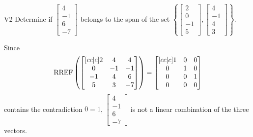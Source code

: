\documentclass{sbgLAexam}
\begin{document}
\begin{problem}{V2}
  Determine if
  \(\begin{bmatrix} 4 \\ -1 \\ 6 \\ -7 \end{bmatrix}\)
  belongs to the span of the set
  \(\left\{
    \begin{bmatrix} 2 \\ 0 \\ -1 \\ 5 \end{bmatrix},
    \begin{bmatrix} 4 \\ -1 \\ 4 \\ 3 \end{bmatrix}
    \right\}
  \).
\end{problem}
\begin{solution}
  Since
  \[
    \operatorname{RREF}\left(
      \begin{bmatrix}[cc|c]
        2 & 4 & 4 \\
        0 & -1 & -1 \\
        -1 & 4 & 6 \\
        5 & 3 & -7
      \end{bmatrix}
    \right) =
    \begin{bmatrix}[cc|c]
      1 & 0 & 0 \\
      0 & 1 & 0 \\
      0 & 0 & 1 \\
      0 & 0 & 0
    \end{bmatrix}
  \]
  contains the contradiction \(0=1\),
  \(\begin{bmatrix} 4 \\ -1 \\ 6 \\ -7 \end{bmatrix}\) is
  not a linear combination of the three vectors.
\end{solution}
\end{document}
